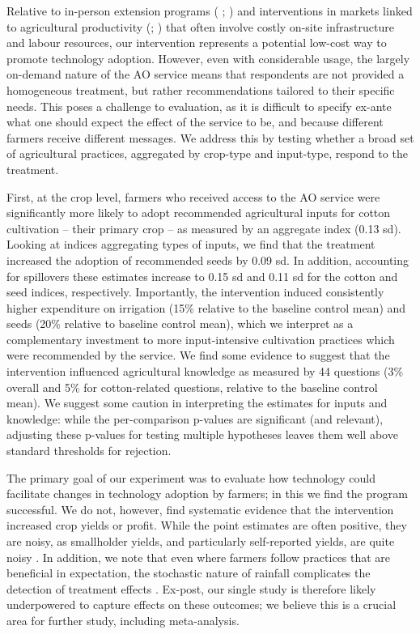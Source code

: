 \documentclass[12pt]{article}
\begin{document}
{\normalsize Relative to in-person extension programs (%
\citealp{Bardhan_2011}; \citealp{duflo2011nudging}) and interventions in
markets linked to agricultural productivity (\citealp{gine2009insurance}; %
\citealp{cole2013barriers}) that often involve costly on-site infrastructure
and labour resources, our intervention represents a potential low-cost way to promote technology adoption. However, even with considerable usage, the largely on-demand nature of the AO service means that respondents are not provided a homogeneous treatment, but rather recommendations tailored to their specific needs. This poses a challenge to evaluation, as it is difficult to specify ex-ante what one should expect the effect of the service to be, and because different farmers receive different messages. We address this by testing whether a broad set of agricultural practices, aggregated by crop-type and input-type, respond to the treatment.}

{\normalsize First, at the crop level, farmers who received access to the AO service were
significantly more likely to adopt recommended agricultural inputs for cotton cultivation -- their primary crop -- as measured by an aggregate index (0.13 sd). Looking at indices aggregating types of inputs, we find that the treatment increased the adoption of recommended seeds by 0.09 sd. In addition, accounting for spillovers these estimates increase to 0.15 sd and 0.11 sd for the cotton and seed indices, respectively.  Importantly, the
intervention induced consistently higher expenditure on irrigation (15\% relative to the baseline control mean) and seeds (20\% relative to baseline control mean), which we interpret as a complementary
investment to more input-intensive cultivation practices which were
recommended by the service. We find some evidence to suggest that the intervention influenced
 agricultural knowledge as measured by 44 questions (3\% overall and 5\% for cotton-related questions, relative to the baseline control mean). We suggest some caution in interpreting the estimates for inputs and knowledge: while the per-comparison p-values are significant (and relevant), adjusting these p-values for testing multiple hypotheses leaves them well above standard thresholds for rejection.}

{\normalsize The primary goal of our experiment was to evaluate how
technology could facilitate changes in technology adoption by farmers; in
this we find the program successful. We do not, however, find systematic evidence that the intervention increased crop yields or profit. While the point estimates are often positive, they are noisy, as smallholder yields, and particularly self-reported yields, are quite noisy \citep{lobell2018eyes}. In addition, we note that even where farmers follow practices that are beneficial in expectation,  the stochastic nature of rainfall complicates the detection of treatment effects \citep{rosenzweig2020external}. Ex-post, our single study is therefore likely underpowered to capture effects on these outcomes; we believe this is a crucial area for further study, including meta-analysis.}
\end{document}
